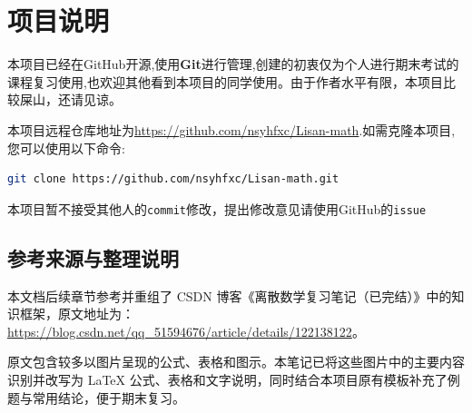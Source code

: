\section{项目说明}

本项目已经在GitHub开源,使用\textbf{Git}进行管理,创建的初衷仅为个人进行期末考试的课程复习使用,也欢迎其他看到本项目的同学使用。由于作者水平有限，本项目比较屎山，还请见谅。

本项目远程仓库地址为\url{https://github.com/nsyhfxc/Lisan-math}.如需克隆本项目,您可以使用以下命令:

\begin{lstlisting}[language=bash]
	git clone https://github.com/nsyhfxc/Lisan-math.git
\end{lstlisting}

本项目暂不接受其他人的\texttt{commit}修改，提出修改意见请使用GitHub的\texttt{issue}

\subsection{参考来源与整理说明}

本文档后续章节参考并重组了 CSDN 博客《离散数学复习笔记（已完结）》中的知识框架，原文地址为：
\url{https://blog.csdn.net/qq_51594676/article/details/122138122}。

原文包含较多以图片呈现的公式、表格和图示。本笔记已将这些图片中的主要内容识别并改写为 \LaTeX{} 公式、表格和文字说明，同时结合本项目原有模板补充了例题与常用结论，便于期末复习。
